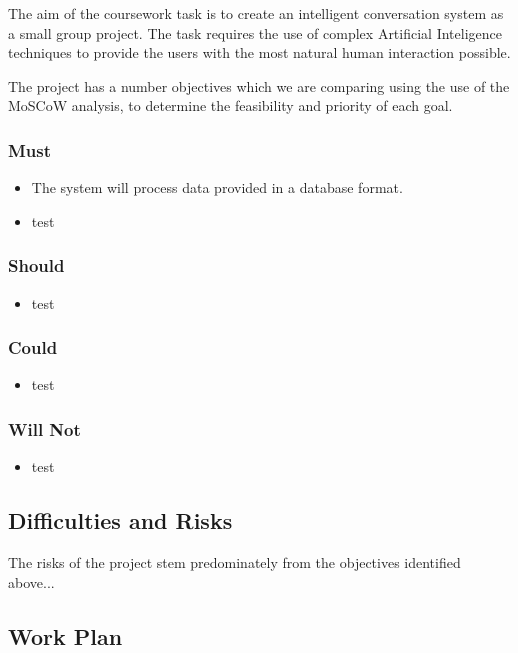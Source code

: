 \documentclass[11pt]{cmpreport}
\begin{document}
The aim of the coursework task is to create an intelligent conversation system as a small group project. The task requires the use of complex Artificial Inteligence techniques to provide the users with the most natural human interaction possible.

The project has a number objectives which we are comparing using the use of the MoSCoW analysis, to determine the feasibility and priority of each goal.

\subsubsection{Must}
\begin{itemize}
\item The system will process data provided in a database format.
\item test
\end{itemize}
\subsubsection{Should}
\begin{itemize}
\item test
\end{itemize}
\subsubsection{Could}
\begin{itemize}
\item test
\end{itemize}
\subsubsection{Will Not}
\begin{itemize}
\item test
\end{itemize}
\subsection{Difficulties and Risks}


The risks of the project stem predominately from the objectives identified above...



\subsection{Work Plan}
\end{document}
